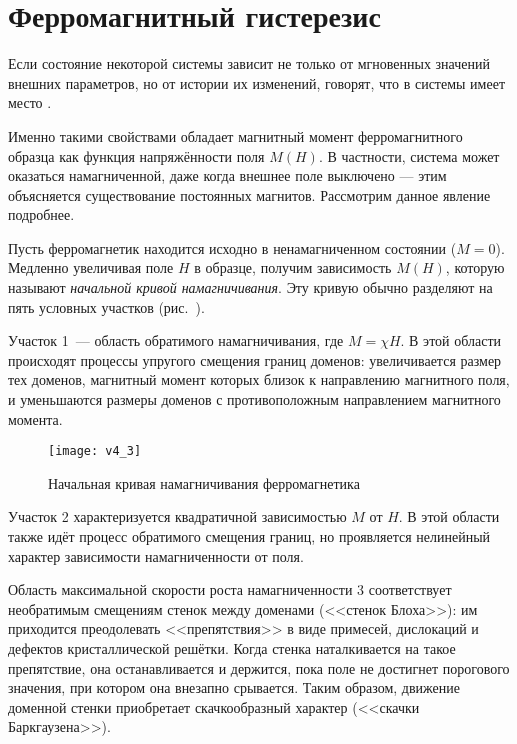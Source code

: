 \section{Ферромагнитный гистерезис}
\label{sec:histeresis}

Если состояние некоторой системы зависит не только от мгновенных значений
внешних параметров, но от истории их изменений, говорят, что
в системы имеет место .

Именно такими свойствами обладает магнитный момент ферромагнитного образца
как функция напряжённости поля $M(H)$. В частности,
система может оказаться намагниченной, даже когда внешнее поле выключено ---
этим объясняется существование постоянных магнитов. Рассмотрим данное явление подробнее.

Пусть ферромагнетик находится исходно в ненамагниченном состоянии
($M = 0$). Медленно увеличивая поле $H$ в образце, получим зависимость
$M(H)$, которую называют \emph{начальной кривой намагничивания}. Эту кривую обычно
разделяют на пять условных участков (рис.~).

Участок 1~--- область обратимого намагничивания, где $M =\chi H$. В этой области
происходят процессы упругого смещения границ доменов: увеличивается размер тех
доменов, магнитный момент которых близок к направлению магнитного поля, и
уменьшаются размеры доменов с противоположным направлением магнитного момента.

\begin{wrapfigure}[]{r}{0.5\textwidth}
\centering\texttt{[image: v4\_3]}
    \caption{Начальная кривая намагничивания ферромагнетика}
\end{wrapfigure}

Участок 2 характеризуется квадратичной зависимостью $M$ от $H$. В этой области
также идёт процесс обратимого смещения границ, но проявляется нелинейный характер
зависимости намагниченности от поля.

Область максимальной скорости роста намагниченности 3 соответствует необратимым
смещениям стенок между доменами (<<стенок Блоха>>):
им приходится преодолевать <<препятствия>> в виде примесей,
дислокаций и дефектов кристаллической решётки.
Когда стенка наталкивается на такое препятствие, она останавливается и держится,
пока поле не достигнет порогового значения, при котором она внезапно
срывается. Таким образом, движение доменной стенки приобретает скачкообразный
характер (<<скачки Баркгаузена>>).

